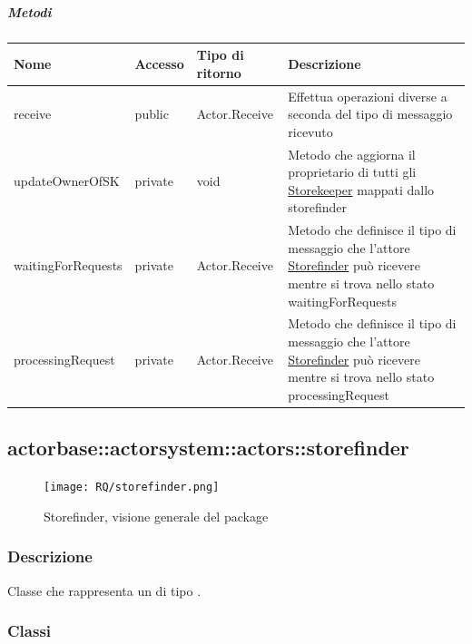 \documentclass{scalatekids-article}
\begin{document}
\subparagraph{Metodi}
\begin{tabular}{| p{3.5cm} | p{1.5cm} | p{2.5cm} | p{10cm} |}
  \hline
  Nome & Accesso & Tipo di ritorno & Descrizione\\
  \hline
  receive & public & Actor.Receive  & Effettua operazioni diverse a seconda del tipo di messaggio ricevuto\\
  \hline
  updateOwnerOfSK & private &  void & Metodo che aggiorna il proprietario di tutti gli \hyperref[sec:actorbase::actorsystem::actors::storekeeper::Storekeeper]{Storekeeper} mappati dallo storefinder\\
  \hline
  waitingForRequests & private & Actor.Receive & Metodo che definisce il tipo di messaggio che l'attore \hyperref[sec:actorbase::actorsystem::actors::storefinder::Storefinder]{Storefinder} può ricevere mentre si trova nello stato waitingForRequests\\
  \hline
  processingRequest & private & Actor.Receive & Metodo che definisce il tipo di messaggio che l'attore \hyperref[sec:actorbase::actorsystem::actors::main::storefinder::Storefinder]{Storefinder} può ricevere mentre si trova nello stato processingRequest\\
  \hline
\end{tabular}


\subsection{actorbase::actorsystem::actors::storefinder}
\label{sec:actorbase::actorsystem::actors::storefinder}

\begin{figure}[H]
  \begin{center}
    \texttt{[image: RQ/storefinder.png]}
    \caption{Storefinder, visione generale del package}
  \end{center}
\end{figure}

\subsubsection{Descrizione}
Classe che rappresenta un  di tipo .

\subsubsection{Classi}
\end{document}
